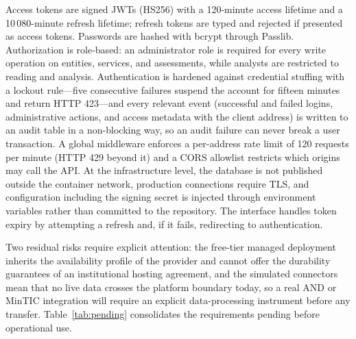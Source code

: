 \documentclass[runningheads]{llncs}
\begin{document}
Access tokens are signed JWTs (HS256) with a 120-minute access lifetime and a
10\,080-minute refresh lifetime; refresh tokens are typed and rejected if
presented as access tokens. Passwords are hashed with bcrypt through Passlib.
Authorization is role-based: an administrator role is required for every write
operation on entities, services, and assessments, while analysts are
restricted to reading and analysis. Authentication is hardened against
credential stuffing with a lockout rule---five consecutive failures suspend
the account for fifteen minutes and return HTTP 423---and every relevant event
(successful and failed logins, administrative actions, and access metadata with
the client address) is written to an audit table in a non-blocking way, so an
audit failure can never break a user transaction. A global middleware enforces
a per-address rate limit of 120 requests per minute (HTTP 429 beyond it) and a
CORS allowlist restricts which origins may call the API. At the infrastructure
level, the database is not published outside the container network, production
connections require TLS, and configuration including the signing secret is
injected through environment variables rather than committed to the
repository. The interface handles token expiry by attempting a refresh and, if
it fails, redirecting to authentication.

Two residual risks require explicit attention: the free-tier managed
deployment inherits the availability profile of the provider and cannot offer
the durability guarantees of an institutional hosting agreement, and the
simulated connectors mean that no live data crosses the platform boundary
today, so a real AND or MinTIC integration will require an explicit
data-processing instrument before any transfer. Table~\ref{tab:pending}
consolidates the requirements pending before operational use.
\end{document}
